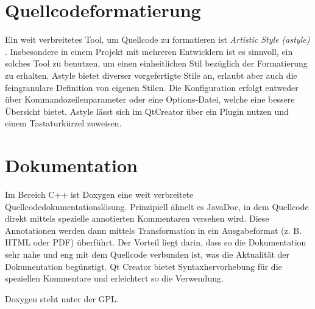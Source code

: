 \section{Quellcodeformatierung}

Ein weit verbreitetes Tool, um Quellcode zu formatieren ist \emph{Artistic Style (astyle)} \cite{astyle}.
Insbesondere in einem Projekt mit mehreren Entwicklern ist es sinnvoll, ein solches Tool zu benutzen, um einen einheitlichen Stil bezüglich der Formatierung zu erhalten.
Astyle bietet diverser vorgefertigte Stile an, erlaubt aber auch die feingranulare Definition von eigenen Stilen.
Die Konfiguration erfolgt entweder über Kommandozeilenparameter oder eine Options-Datei, welche eine bessere Übersicht bietet.
Astyle lässt sich im QtCreator über ein Plugin nutzen und einem Tastaturkürzel zuweisen.

\section{Dokumentation} 

Im Bereich C++ ist Doxygen \cite{Doxygen} eine weit verbreitete Quellcodedokumentationslösung.
Prinzipiell ähnelt es JavaDoc, in dem Quellcode direkt mittels spezielle annotierten Kommentaren versehen wird.
Diese Annotationen werden dann mittels Transformation in ein Ausgabeformat (z. B. HTML oder PDF) überführt.
Der Vorteil liegt darin, dass so die Dokumentation sehr nahe und eng mit dem Quellcode verbunden ist, was die Aktualität der Dokumentation begünstigt.
Qt Creator bietet Syntaxhervorhebung für die speziellen Kommentare und erleichtert so die Verwendung.

Doxygen steht unter der GPL.
